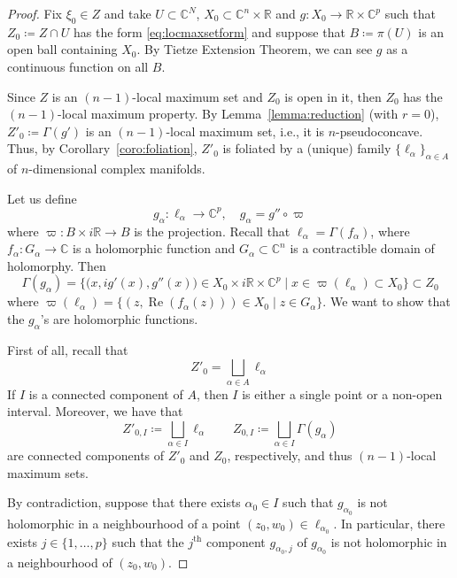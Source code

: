 \documentclass[reqno,oneside]{amsart}
\newcommand{\numberset}{\mathbb}
\newcommand{\R}{\numberset{R}}
\newcommand{\C}{\numberset{C}}
\DeclareMathOperator{\Realpart}{Re}
\renewcommand{\Re}{\Realpart}
\theoremstyle{definition}
\theoremstyle{plain}
\theoremstyle{remark}
\begin{document}
\begin{proof}
    Fix $\xi_0\in Z$ and take $U\subset\C^N$, $X_0\subset\C^n\times\R$ and $g:X_0\to\R\times\C^p$ such that $Z_0\coloneqq Z\cap U$ has the form \eqref{eq:locmaxsetform} and suppose that $B\coloneqq\pi(U)$ is an open ball containing $X_0$. By Tietze Extension Theorem, we can see $g$ as a continuous function on all $B$.
    
    Since $Z$ is an $(n-1)$-local maximum set and $Z_0$ is open in it, then $Z_0$ has the $(n-1)$-local maximum property. By Lemma~\ref{lemma:reduction} (with $r=0$), $Z'_0\coloneqq\Gamma(g')$ is an $(n-1)$-local maximum set, i.e., it is $n$-pseudoconcave. Thus, by Corollary~\ref{coro:foliation}, $Z'_0$ is foliated by a (unique) family $\{\ell_\alpha\}_{\alpha\in A}$ of $n$-dimensional complex manifolds.

    Let us define
    \[
        g_\alpha:\ell_\alpha\to\C^p, \quad g_\alpha=g''\circ\varpi
    \]
    where $\varpi:B\times i\R\to B$ is the projection. Recall that $\ell_\alpha=\Gamma(f_\alpha)$, where $f_\alpha:G_\alpha\to\C$ is a holomorphic function and $G_\alpha\subset\C^n$ is a contractible domain of holomorphy. Then
    \[
        \Gamma(g_\alpha)=\bigl\{\bigl(x,ig'(x),g''(x)\bigr)\in X_0\times i\R\times\C^p \mid x\in\varpi(\ell_\alpha)\subset X_0\bigr\}\subset Z_0
    \]
    where $\varpi(\ell_\alpha)=\{(z,\Re(f_\alpha(z)))\in X_0 \mid z\in G_\alpha\}$. We want to show that the $g_\alpha$'s are holomorphic functions.

    First of all, recall that 
    \[
    	Z'_0=\bigsqcup_{\alpha\in A} \ell_\alpha
    \]
    If $I$ is a connected component of $A$, then $I$ is either a single point or a non-open interval. Moreover, we have that
    \[
        Z'_{0,I}\coloneqq\bigsqcup_{\alpha\in I} \ell_\alpha \qquad Z_{0,I}\coloneqq\bigsqcup_{\alpha\in I} \Gamma(g_\alpha)
    \]
    are connected components of $Z'_0$ and $Z_0$, respectively, and thus $(n-1)$-local maximum sets.

    By contradiction, suppose that there exists $\alpha_0\in I$ such that $g_{\alpha_0}$ is not holomorphic in a neighbourhood of a point $(z_0,w_0)\in\ell_{\alpha_0}$. In particular, there exists $j\in\{1,\dots,p\}$ such that the $j^{\text{th}}$ component $g_{\alpha_0,j}$ of $g_{\alpha_0}$ is not holomorphic in a neighbourhood of $(z_0,w_0)$.


\end{proof}
\end{document}
